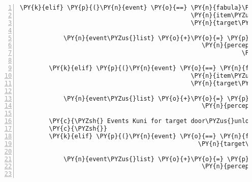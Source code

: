 \begin{Verbatim}[commandchars=\\\{\},numbers=left,firstnumber=1,stepnumber=1]
        \PY{k}{elif} \PY{p}{(}\PY{n}{event} \PY{o}{==} \PY{n}{fabula}\PY{o}{.}\PY{n}{TriesToDropEvent}\PY{p}{(}\PY{n}{identifier}\PY{o}{=}\PY{n}{ID\PYZus{}KUNI}\PY{p}{,}
                                               \PY{n}{item\PYZus{}identifier}\PY{o}{=}\PY{l+s}{\PYZsq{}}\PY{l+s}{cobweb}\PY{l+s}{\PYZsq{}}\PY{p}{,}
                                               \PY{n}{target\PYZus{}identifier}\PY{o}{=}\PY{l+s}{\PYZsq{}}\PY{l+s}{door}\PY{l+s}{\PYZsq{}}\PY{p}{)}\PY{p}{)}\PY{p}{:}

            \PY{n}{event\PYZus{}list} \PY{o}{+}\PY{o}{=} \PY{p}{[}\PY{n}{fabula}\PY{o}{.}\PY{n}{PerceptionEvent}\PY{p}{(}\PY{n}{identifier}\PY{o}{=}\PY{n}{ID\PYZus{}KUNI}\PY{p}{,}
                                                  \PY{n}{perception}\PY{o}{=}\PY{l+s}{\PYZsq{}}\PY{l+s}{Warum soll ich Spinnweben an diese Tür kleben? }\PY{l+s}{\PYZsq{}}
                                                             \PY{l+s}{\PYZsq{}}\PY{l+s}{Davon geht sie ja doch nicht auf.}\PY{l+s}{\PYZsq{}}\PY{p}{)}\PY{p}{]}

        \PY{k}{elif} \PY{p}{(}\PY{n}{event} \PY{o}{==} \PY{n}{fabula}\PY{o}{.}\PY{n}{TriesToDropEvent}\PY{p}{(}\PY{n}{identifier}\PY{o}{=}\PY{n}{ID\PYZus{}KUNI}\PY{p}{,}
                                               \PY{n}{item\PYZus{}identifier}\PY{o}{=}\PY{l+s}{\PYZsq{}}\PY{l+s}{cobweb}\PY{l+s}{\PYZsq{}}\PY{p}{,}
                                               \PY{n}{target\PYZus{}identifier}\PY{o}{=}\PY{l+s}{\PYZsq{}}\PY{l+s}{key}\PY{l+s}{\PYZsq{}}\PY{p}{)}\PY{p}{)}\PY{p}{:}

            \PY{n}{event\PYZus{}list} \PY{o}{+}\PY{o}{=} \PY{p}{[}\PY{n}{fabula}\PY{o}{.}\PY{n}{PerceptionEvent}\PY{p}{(}\PY{n}{identifier}\PY{o}{=}\PY{n}{ID\PYZus{}KUNI}\PY{p}{,}
                                                  \PY{n}{perception}\PY{o}{=}\PY{l+s}{\PYZsq{}}\PY{l+s}{Der Schlüssel muss nicht geklebt werden.}\PY{l+s}{\PYZsq{}}\PY{p}{)}\PY{p}{]}

        \PY{c}{\PYZsh{} Events Kuni for target door\PYZus{}unlocked}
        \PY{c}{\PYZsh{}}
        \PY{k}{elif} \PY{p}{(}\PY{n}{event} \PY{o}{==} \PY{n}{fabula}\PY{o}{.}\PY{n}{TriesToLookAtEvent}\PY{p}{(}\PY{n}{identifier}\PY{o}{=}\PY{n}{ID\PYZus{}KUNI}\PY{p}{,}
                                                 \PY{n}{target\PYZus{}identifier}\PY{o}{=}\PY{l+s}{\PYZsq{}}\PY{l+s}{door\PYZus{}unlocked}\PY{l+s}{\PYZsq{}}\PY{p}{)}\PY{p}{)}\PY{p}{:}

            \PY{n}{event\PYZus{}list} \PY{o}{+}\PY{o}{=} \PY{p}{[}\PY{n}{fabula}\PY{o}{.}\PY{n}{PerceptionEvent}\PY{p}{(}\PY{n}{identifier}\PY{o}{=}\PY{n}{ID\PYZus{}KUNI}\PY{p}{,}
                                                  \PY{n}{perception}\PY{o}{=}\PY{l+s}{\PYZsq{}}\PY{l+s}{Hier gehts für mich weiter Richtung Zauberwald.}\PY{l+s}{\PYZsq{}}\PY{p}{)}\PY{p}{]}


\end{Verbatim}
